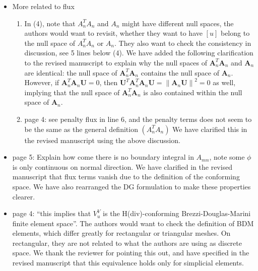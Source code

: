 \documentclass[10pt]{article}
\newcommand{\nor}[1]{\left\| #1 \right\|}
\newcommand{\note}[1]{{\color{blue}#1}}
\begin{document}
\begin{itemize}
\begin{enumerate}
\note{We have revised this to include a citation for the pseudo-inverse.  However, we could not find the typo within the symbol of the pseudo-inverse (we are using the ``dagger'' symbol in \LaTeX).  }
\item 1 line above section 3: it is too strong to state "CFL restrictions ... will be identical..'' unless the authors have a mathematical proof for this.
\note{We agree, and have added a justification for the CFL restriction in the revised manuscript.  We have also corrected an error in the scaling of $\tau$.}
\end{enumerate}
\item More related to flux
\begin{enumerate}
\item In (4), note that $A_n^TA_n$ and $A_n$ might have different null spaces, the authors would want to revisit, whether they want to have $[u]$ belong to the null space of $A_n^TA_n$ or $A_n$.  They also want to check the consistency in discussion, see 5 lines below (4).
\note{We have added the following clarification to the revised manuscript to explain why the null spaces of $\bm{A}_n^T\bm{A}_n$ and $\bm{A}_n$ are identical: the null space of $\bm{A}_n^T\bm{A}_n$ contains the null space of $\bm{A}_n$.  However, if $\bm{A}_n^T\bm{A}_n\bm{U} = 0$, then $\bm{U}^T\bm{A}_n^T\bm{A}_n\bm{U} = \nor{\bm{A}_n\bm{U}}^2 = 0$ as well, implying that the null space of $\bm{A}_n^T\bm{A}_n$ is also contained within the null space of $\bm{A}_n$. 
}
\item page 4: see penalty flux in line 6, and the penalty terms does not seem to be the same as the general definition $(A_n^T A_n)$
\note{We have clarified this in the revised manuscript using the above discussion.}
\end{enumerate}
\item page 5: Explain how come there is no boundary integral in $A_{mn}$, note some $\phi$ is only continuous on normal direction.
\note{We have clarified in the revised manuscript that flux terms vanish due to the definition of the conforming space.  We have also rearranged the DG formulation to make these properties clearer. }
\item page 4: ``this implies that $V_u^V$ is the H(div)-conforming Brezzi-Douglas-Marini finite element space''. The authors would want to check the definition of BDM elements, which differ greatly for rectangular or triangular meshes. On rectangular, they are not related to what the authors are using as discrete space.  
\note{We thank the reviewer for pointing this out, and have specified in the revised manuscript that this equivalence holds only for simplicial elements.}

\end{itemize}
\end{document}
